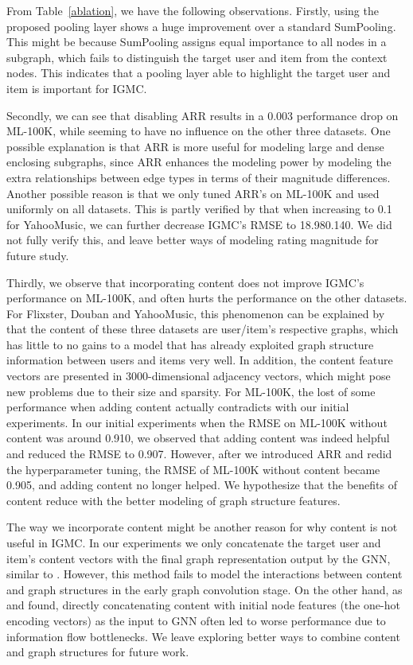\documentclass{article} \usepackage{iclr2020_conference,times}
\begin{document}
From Table~\ref{ablation}, we have the following observations. Firstly, using the proposed pooling layer shows a huge improvement over a standard SumPooling. This might be because SumPooling assigns equal importance to all nodes in a subgraph, which fails to distinguish the target user and item from the context nodes. This indicates that a pooling layer able to highlight the target user and item is important for IGMC.

Secondly, we can see that disabling ARR results in a 0.003 performance drop on ML-100K, while seeming to have no influence on the other three datasets. One possible explanation is that ARR is more useful for modeling large and dense enclosing subgraphs, since ARR enhances the modeling power by modeling the extra relationships between edge types in terms of their magnitude differences. Another possible reason is that we only tuned ARR's  on ML-100K and used  uniformly on all datasets. This is partly verified by that when increasing  to 0.1 for YahooMusic, we can further decrease IGMC's RMSE to 18.980.140. We did not fully verify this, and leave better ways of modeling rating magnitude for future study. 

Thirdly, we observe that incorporating content does not improve IGMC's performance on ML-100K, and often hurts the performance on the other datasets. For Flixster, Douban and YahooMusic, this phenomenon can be explained by that the content of these three datasets are user/item's respective graphs, which has little to no gains to a model that has already exploited graph structure information between users and items very well. In addition, the content feature vectors are presented in 3000-dimensional adjacency vectors, which might pose new problems due to their size and sparsity. For ML-100K, the lost of some performance when adding content actually contradicts with our initial experiments. In our initial experiments when the RMSE on ML-100K without content was around 0.910, we observed that adding content was indeed helpful and reduced the RMSE to 0.907. However, after we introduced ARR and redid the hyperparameter tuning, the RMSE of ML-100K without content became 0.905, and adding content no longer helped. We hypothesize that the benefits of content reduce with the better modeling of graph structure features.

The way we incorporate content might be another reason for why content is not useful in IGMC. In our experiments we only concatenate the target user and item's content vectors with the final graph representation output by the GNN, similar to \citep{berg2017graph}. However, this method fails to model the interactions between content and graph structures in the early graph convolution stage. On the other hand, as \citet{berg2017graph} and \citet{zhang2018link} found, directly concatenating content with initial node features (the one-hot encoding vectors) as the input to GNN often led to worse performance due to information flow bottlenecks. We leave exploring better ways to combine content and graph structures for future work.
\end{document}
